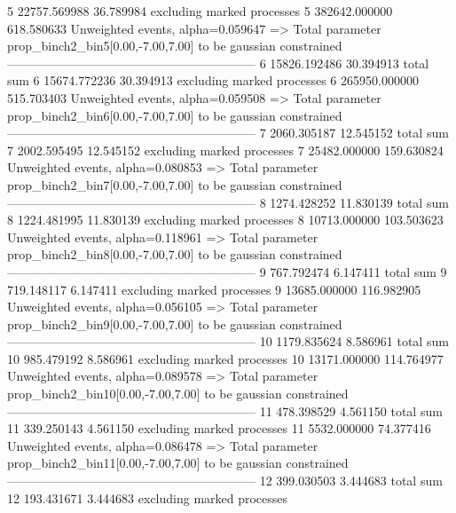 5          22757.569988    36.789984       excluding marked processes    
5          382642.000000   618.580633      Unweighted events, alpha=0.059647
  => Total parameter prop_binch2_bin5[0.00,-7.00,7.00] to be gaussian constrained
------------------------------------------------------------
6          15826.192486    30.394913       total sum                     
6          15674.772236    30.394913       excluding marked processes    
6          265950.000000   515.703403      Unweighted events, alpha=0.059508
  => Total parameter prop_binch2_bin6[0.00,-7.00,7.00] to be gaussian constrained
------------------------------------------------------------
7          2060.305187     12.545152       total sum                     
7          2002.595495     12.545152       excluding marked processes    
7          25482.000000    159.630824      Unweighted events, alpha=0.080853
  => Total parameter prop_binch2_bin7[0.00,-7.00,7.00] to be gaussian constrained
------------------------------------------------------------
8          1274.428252     11.830139       total sum                     
8          1224.481995     11.830139       excluding marked processes    
8          10713.000000    103.503623      Unweighted events, alpha=0.118961
  => Total parameter prop_binch2_bin8[0.00,-7.00,7.00] to be gaussian constrained
------------------------------------------------------------
9          767.792474      6.147411        total sum                     
9          719.148117      6.147411        excluding marked processes    
9          13685.000000    116.982905      Unweighted events, alpha=0.056105
  => Total parameter prop_binch2_bin9[0.00,-7.00,7.00] to be gaussian constrained
------------------------------------------------------------
10         1179.835624     8.586961        total sum                     
10         985.479192      8.586961        excluding marked processes    
10         13171.000000    114.764977      Unweighted events, alpha=0.089578
  => Total parameter prop_binch2_bin10[0.00,-7.00,7.00] to be gaussian constrained
------------------------------------------------------------
11         478.398529      4.561150        total sum                     
11         339.250143      4.561150        excluding marked processes    
11         5532.000000     74.377416       Unweighted events, alpha=0.086478
  => Total parameter prop_binch2_bin11[0.00,-7.00,7.00] to be gaussian constrained
------------------------------------------------------------
12         399.030503      3.444683        total sum                     
12         193.431671      3.444683        excluding marked processes    
